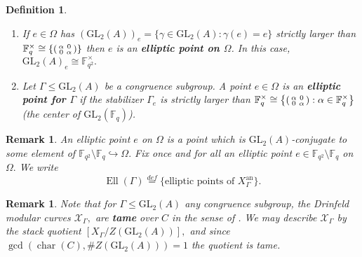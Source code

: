 \documentclass[11pt]{amsart}
\newtheorem{definition}[theorem]{Definition}
\newtheorem{remark}[theorem]{Remark}
\theoremstyle{definition}
\newenvironment{psmallmatrix}
{\left(\begin{smallmatrix}}
	{\end{smallmatrix}\right)}
\numberwithin{equation}{section}
\newcommand{\GL}{\mathrm{GL}} 	%
\newcommand{\sX}{\mathscr{X}}		%
\newcommand{\bbF}{\mathbb{F}}		%
\begin{document}
		\begin{definition}\label{d: elliptic pt}
			$~$
			\begin{enumerate}
				\item	If $e\in \Omega$ has $(\GL_2(A))_e=\{\gamma\in \GL_2(A):\gamma(e)=e\}$ strictly larger than $\bbF_q^{\times}\cong \left\{\begin{psmallmatrix}\alpha&0\\0&\alpha\end{psmallmatrix}\right\}$ then $e$ is an \textbf{elliptic point on $\Omega$}. In this case, $\GL_2(A)_e\cong \bbF_{q^2}^{\times}.$\\
				
				\item	Let $\Gamma\leq \GL_2(A)$ be a congruence subgroup. A point $e\in \Omega$ is an \textbf{elliptic point for $\Gamma$} if the stabilizer $\Gamma_e$ is strictly larger than $\displaystyle{\bbF_q^{\times}\cong\left\{\begin{psmallmatrix}\alpha&0\\0&\alpha\end{psmallmatrix}:\alpha\in \bbF_q^{\times}\right\}}$ (the center of $\GL_2(\bbF_q)$). 
			\end{enumerate}
		\end{definition}
		
		\begin{remark}\label{remark: unique elliptic point for Omega}
			An elliptic point $e$ on $\Omega$ is a point which is $\GL_2(A)$-conjugate to some element of $\bbF_{q^2}\setminus\bbF_q\hookrightarrow \Omega.$ Fix once and for all an elliptic point $e\in \bbF_{q^2}\setminus\bbF_q$ on $\Omega.$ 
			We write
			\[\operatorname{Ell}(\Gamma)\overset{def}{=}\{\text{elliptic points of }X_{\Gamma}^{\text{an}}\}.\]
		\end{remark}
		
		\begin{remark}\label{remark: tameness of Drinfeld modular curves}
			Note that for $\Gamma\leq \GL_2(A)$ any congruence subgroup, the Drinfeld modular curves $\sX_{\Gamma},$ are \textbf{tame} over $C$ in the sense of \cite[Example $5.2.7$]{VZB}. We may describe $\sX_{\Gamma}$ by the stack quotient $[X_{\Gamma}/Z(\GL_2(A))],$ and since $\gcd(\operatorname{char}(C),\#Z(\GL_2(A)))=1$ the quotient is tame. 
		\end{remark}
		
\end{document}
